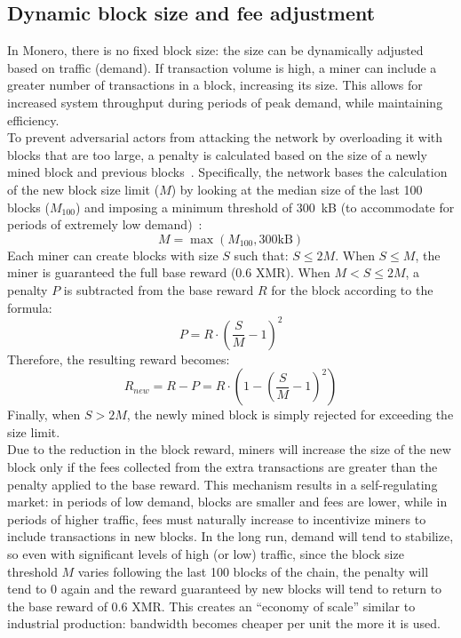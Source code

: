 \documentclass[conference]{IEEEtran}
\begin{document}
\subsection{Dynamic block size and fee adjustment}
In Monero, there is no fixed block size: the size can be dynamically adjusted based on traffic (demand). If transaction volume is high, a miner can include a greater number of transactions in a block, increasing its size. This allows for increased system throughput during periods of peak demand, while maintaining efficiency.~\cite{zero_to_monero_2}\\
To prevent adversarial actors from attacking the network by overloading it with blocks that are too large, a penalty is calculated based on the size of a newly mined block and previous blocks~\cite{zero_to_monero_2}. Specifically, the network bases the calculation of the new block size limit ($M$) by looking at the median size of the last 100 blocks ($M_{100}$) and imposing a minimum threshold of 300~kB (to accommodate for periods of extremely low demand)~\cite{zero_to_monero_2}:
\[
M = \max(M_{100}, 300\text{kB})
\]
Each miner can create blocks with size $S$ such that: $S \leq 2M$. When $S \leq M$, the miner is guaranteed the full base reward (0.6 XMR). When $M < S \leq 2M$, a penalty $P$ is subtracted from the base reward $R$ for the block according to the formula:
\[
P = R \cdot \left( \frac{S}{M} - 1 \right)^2
\]
Therefore, the resulting reward becomes:
\[
R_{new} = R - P = R \cdot \left( 1 - \left( \frac{S}{M} - 1 \right)^2 \right)
\]
Finally, when $S > 2M$, the newly mined block is simply rejected for exceeding the size limit.~\cite{zero_to_monero_2}\\
Due to the reduction in the block reward, miners will increase the size of the new block only if the fees collected from the extra transactions are greater than the penalty applied to the base reward. This mechanism results in a self-regulating market: in periods of low demand, blocks are smaller and fees are lower, while in periods of higher traffic, fees must naturally increase to incentivize miners to include transactions in new blocks. In the long run, demand will tend to stabilize, so even with significant levels of high (or low) traffic, since the block size threshold $M$ varies following the last 100 blocks of the chain, the penalty will tend to 0 again and the reward guaranteed by new blocks will tend to return to the base reward of 0.6 XMR. This creates an ``economy of scale'' similar to industrial production: bandwidth becomes cheaper per unit the more it is used.~\cite{zero_to_monero_2}
\end{document}
